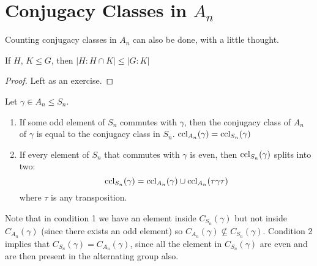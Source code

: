 \documentclass[../Main.tex]{subfiles}
\begin{document}
\section{Conjugacy Classes in \texorpdfstring{$A_n$}{An}}
Counting conjugacy classes in $A_n$ can also be done, with a little thought.
\begin{proposition}
    If $H$, $K \leq G$, then $|H : H \cap K| \leq |G : K|$
    \label{propSubgroupIndices}
\end{proposition}
\begin{proof}
Left as an exercise.
\end{proof}%
\begin{lemma}
    Let $\gamma \in A_n \leq S_n$.
    \begin{enumerate}
        \item If some odd element of $S_n$ commutes with $\gamma$, then the conjugacy class of $A_n$ of $\gamma$ is equal to the conjugacy class in $S_n$. $\operatorname{ccl}_{A_n}(\gamma) = \operatorname{ccl}_{S_n}(\gamma)$
        \item If every element of $S_n$ that commutes with $\gamma$ is even, then $\operatorname{ccl}_{S_n}(\gamma)$ splits into two:
        \begin{equation*}
            \operatorname{ccl}_{S_n}(\gamma) = \operatorname{ccl}_{A_n}(\gamma) \cup \operatorname{ccl}_{A_n}(\tau\gamma\tau) 
        \end{equation*}
        where $\tau$ is any transposition.
    \end{enumerate}
    \label{lemConjugacyAn}
\end{lemma}
Note that in condition 1 we have an element inside $C_{S_n}(\gamma)$ but not inside $C_{A_n}(\gamma)$ (since there exists an odd element) so $C_{A_n}(\gamma) \nsubseteq C_{S_n}(\gamma)$. Condition 2 implies that $C_{S_n}(\gamma) = C_{A_n}(\gamma)$, since all the element in $C_{S_n}(\gamma)$ are even and are then present in the alternating group also.\par
\end{document}

